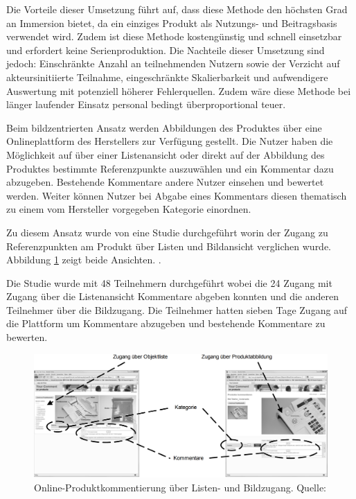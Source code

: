 Die Vorteile dieser Umsetzung führt \citeauthor{Kirschner2012} auf, dass diese Methode den höchsten Grad an Immersion bietet, da ein einziges Produkt als  Nutzungs- und
Beitragsbasis verwendet wird. Zudem ist diese Methode kostengünstig und schnell einsetzbar und erfordert keine Serienproduktion. 
Die Nachteile dieser Umsetzung sind jedoch: Einschränkte Anzahl an teilnehmenden Nutzern sowie der Verzicht auf akteursinitiierte Teilnahme, eingeschränkte Skalierbarkeit und aufwendigere Auswertung mit potenziell 
höherer Fehlerquellen. Zudem wäre diese Methode bei länger laufender Einsatz personal bedingt überproportional teuer. \cite[S.~125]{Kirschner2012}

Beim bildzentrierten Ansatz werden Abbildungen des Produktes über eine Onlineplattform des Herstellers zur Verfügung gestellt. Die Nutzer haben die Möglichkeit auf über einer Listenansicht oder direkt auf der 
Abbildung des Produktes bestimmte Referenzpunkte auszuwählen und ein Kommentar dazu abzugeben. Bestehende Kommentare andere Nutzer einsehen und bewertet werden. Weiter können Nutzer bei Abgabe eines Kommentars
diesen thematisch zu einem vom Hersteller vorgegeben Kategorie einordnen. \cite[S.~127]{Kirschner2012}

Zu diesem Ansatz wurde \citeyear{Kirschner2011} von \citeauthor{Kirschner2011} eine Studie durchgeführt worin der Zugang zu Referenzpunkten am Produkt über Listen und Bildansicht verglichen wurde. Abbildung 
\ref{img:ipi_list_image} zeigt beide Ansichten. \cite{Kirschner2011}.

Die Studie wurde mit 48 Teilnehmern durchgeführt wobei die 24 Zugang mit Zugang über die Listenansicht Kommentare abgeben konnten und die anderen Teilnehmer über die Bildzugang. Die Teilnehmer hatten sieben Tage 
Zugang auf die Plattform um Kommentare abzugeben und bestehende Kommentare zu bewerten. 

\begin{figure}[H]
	\centering
	\includegraphics[width=1.0\textwidth]{resources/analyse/IPI_Vergleich_Listen_BildAnnotationeAnsicht.png}
	\caption{Online-Produktkommentierung über Listen- und Bildzugang. Quelle: \cite[S.~7]{Kirschner2011}}
	\label{img:ipi_list_image}
\end{figure}

